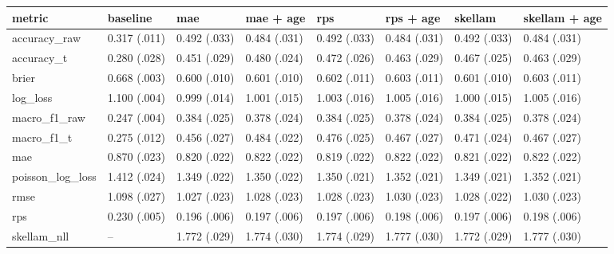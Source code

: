 
\begin{tabular}{llllllll}
\toprule
metric & baseline & mae & mae + age & rps & rps + age & skellam & skellam + age\\
\midrule
accuracy\_raw & 0.317 (.011) & 0.492 (.033) & 0.484 (.031) & 0.492 (.033) & 0.484 (.031) & 0.492 (.033) & 0.484 (.031)\\
accuracy\_t & 0.280 (.028) & 0.451 (.029) & 0.480 (.024) & 0.472 (.026) & 0.463 (.029) & 0.467 (.025) & 0.463 (.029)\\
brier & 0.668 (.003) & 0.600 (.010) & 0.601 (.010) & 0.602 (.011) & 0.603 (.011) & 0.601 (.010) & 0.603 (.011)\\
log\_loss & 1.100 (.004) & 0.999 (.014) & 1.001 (.015) & 1.003 (.016) & 1.005 (.016) & 1.000 (.015) & 1.005 (.016)\\
macro\_f1\_raw & 0.247 (.004) & 0.384 (.025) & 0.378 (.024) & 0.384 (.025) & 0.378 (.024) & 0.384 (.025) & 0.378 (.024)\\
macro\_f1\_t & 0.275 (.012) & 0.456 (.027) & 0.484 (.022) & 0.476 (.025) & 0.467 (.027) & 0.471 (.024) & 0.467 (.027)\\
mae & 0.870 (.023) & 0.820 (.022) & 0.822 (.022) & 0.819 (.022) & 0.822 (.022) & 0.821 (.022) & 0.822 (.022)\\
poisson\_log\_loss & 1.412 (.024) & 1.349 (.022) & 1.350 (.022) & 1.350 (.021) & 1.352 (.021) & 1.349 (.021) & 1.352 (.021)\\
rmse & 1.098 (.027) & 1.027 (.023) & 1.028 (.023) & 1.028 (.023) & 1.030 (.023) & 1.028 (.022) & 1.030 (.023)\\
rps & 0.230 (.005) & 0.196 (.006) & 0.197 (.006) & 0.197 (.006) & 0.198 (.006) & 0.197 (.006) & 0.198 (.006)\\
skellam\_nll & -- & 1.772 (.029) & 1.774 (.030) & 1.774 (.029) & 1.777 (.030) & 1.772 (.029) & 1.777 (.030)\\
\bottomrule
\end{tabular}
